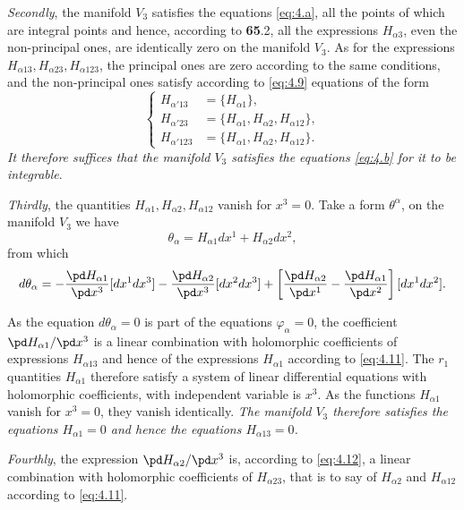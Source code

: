\emph{Secondly}, the manifold $V_{3}$ satisfies the equations \eqref{eq:4.a}, all the points of which are integral points and hence, according to \textsection\textbf{65}.2, all the expressions $H_{\alpha 3}$, even the non-principal ones, are identically zero on the manifold $V_{3}$. As for the expressions $H_{\alpha 13}, H_{\alpha 23}, H_{\alpha 123}$, the principal ones are zero according to the same conditions, and the non-principal ones satisfy according to \eqref{eq:4.9} equations of the form
\begin{equation}
  \label{eq:4.11}
  \left\{
    \begin{aligned}
      H_{\alpha'13}&=\{H_{\alpha 1}\},\\
      H_{\alpha'23}&=\{H_{\alpha 1},H_{\alpha 2},H_{\alpha 12}\},\\
      H_{\alpha'123}&=\{H_{\alpha 1},H_{\alpha 2},H_{\alpha 12}\}.
    \end{aligned}
  \right.
\end{equation}
\emph{It therefore suffices that the manifold $V_{3}$ satisfies the equations \eqref{eq:4.b} for it to be integrable}.

\emph{Thirdly}, the quantities $H_{\alpha 1}, H_{\alpha 2}, H_{\alpha 12}$ vanish for $x^{3}=0$. Take a form $\theta^{\alpha}$, on the manifold $V_{3}$ we have
\[
\theta_{\alpha}=H_{\alpha 1}dx^{1}+H_{\alpha 2}dx^{2},
\]
from which
\begin{equation}
  \label{eq:4.12}
  d\theta_{\alpha}=-\frac{\pd H_{\alpha 1}}{\pd x^{3}}[dx^{1}dx^{3}]-\frac{\pd H_{\alpha 2}}{\pd x^{3}}[dx^{2}dx^{3}]+\left[\frac{\pd H_{\alpha 2}}{\pd x^{1}}-\frac{\pd H_{\alpha 1}}{\pd x^{2}}\right][dx^{1}dx^{2}].
\end{equation}

As the equation $d\theta_{\alpha}=0$ is part of the equations $\varphi_{\alpha}=0$, the coefficient $\pd H_{\alpha 1}/\pd x^{3}$ is a linear combination with holomorphic coefficients of expressions $H_{\alpha 13}$ and hence of the expressions $H_{\alpha 1}$ according to \eqref{eq:4.11}. The $r_{1}$ quantities $H_{\alpha 1}$ therefore satisfy a system of linear differential equations with holomorphic coefficients, with independent variable is $x^{3}$. As the functions $H_{\alpha 1}$ vanish for $x^{3}=0$, they vanish identically. \emph{The manifold $V_{3}$ therefore satisfies the equations $H_{\alpha 1}=0$ and hence the equations $H_{\alpha 13}=0$.}

\emph{Fourthly}, the expression $\pd H_{\alpha 2}/\pd x^{3}$ is, according to \eqref{eq:4.12}, a linear combination with holomorphic coefficients of $H_{\alpha 23}$, that is to say of $H_{\alpha 2}$ and $H_{\alpha 12}$ according to \eqref{eq:4.11}.

